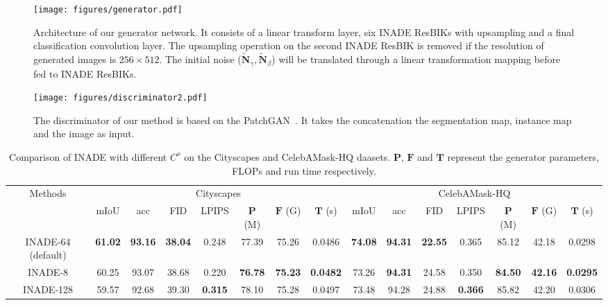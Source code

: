 \documentclass[final]{cvpr}
\begin{document}
\begin{figure}[tp]
  \centering
  \texttt{[image: figures/generator.pdf]}
  \caption{Architecture of our generator network. It consists of a linear transform layer, six INADE ResBIKs with upsampling and a final classification convolution layer. The upsampling operation on the second INADE ResBIK is removed if the resolution of generated images is $256\times 512$. The initial noise ($\tilde{\bm{N}}_\gamma, \tilde{\bm{N}}_\beta$) will be translated through a linear transformation mapping before fed to INADE ResBIKs.}
  \label{fig:generator}
\end{figure}

\begin{figure}[tp]
  \centering
  \texttt{[image: figures/discriminator2.pdf]}
  \caption{The discriminator of our method is based on the PatchGAN~\cite{isola2017image}. It takes the concatenation the segmentation map, instance map and the image as input.}
  \label{fig:discriminator}
\end{figure}

\begin{table*}[t]
\setlength{\tabcolsep}{1.8mm}
    \centering
    \caption{Comparison of INADE with different $C^o$ on the Cityscapes and CelebAMask-HQ daasets. $\mathbf{P}$, $\mathbf{F}$ and $\mathbf{T}$ represent the generator parameters, FLOPs and run time respectively.}
\footnotesize
    \begin{tabular}{c|c|c|c|c|c|c|c|c|c|c|c|c|c|c}
    \hline
        \multirow{2}{*}{Methods} & \multicolumn{7}{c|}{Cityscapes} & \multicolumn{7}{c}{CelebAMask-HQ}\\
        \cline{2-15}
         & mIoU & acc & FID & LPIPS & $\mathbf{P}$ (M) & $\mathbf{F}$ (G) & $\mathbf{T}$ (s) & mIoU & acc & FID & LPIPS & $\mathbf{P}$ (M) & $\mathbf{F}$ (G) & $\mathbf{T}$ (s)\\
        \hline
        INADE-64 (default) & \textbf{61.02} & \textbf{93.16} & \textbf{38.04} & 0.248 & 77.39 & 75.26 & 0.0486 & \textbf{74.08} & \textbf{94.31} & \textbf{22.55} & 0.365 & 85.12 & 42.18 & 0.0298 \\
        \hline
        INADE-8 & 60.25 & 93.07 & 38.68 & 0.220 & \textbf{76.78} & \textbf{75.23} & \textbf{0.0482} & 73.26 & \textbf{94.31} & 24.58 & 0.350 & \textbf{84.50} & \textbf{42.16} & \textbf{0.0295}\\
        \hline
        INADE-128 & 59.57 & 92.68 & 39.30 & \textbf{0.315} & 78.10 & 75.28 & 0.0497 & 73.48 & 94.28 & 24.88 & \textbf{0.366} & 85.82 & 42.20 & 0.0306\\
        \hline
    \end{tabular}
    \label{tab:ablation}
\end{table*}{}
\end{document}
